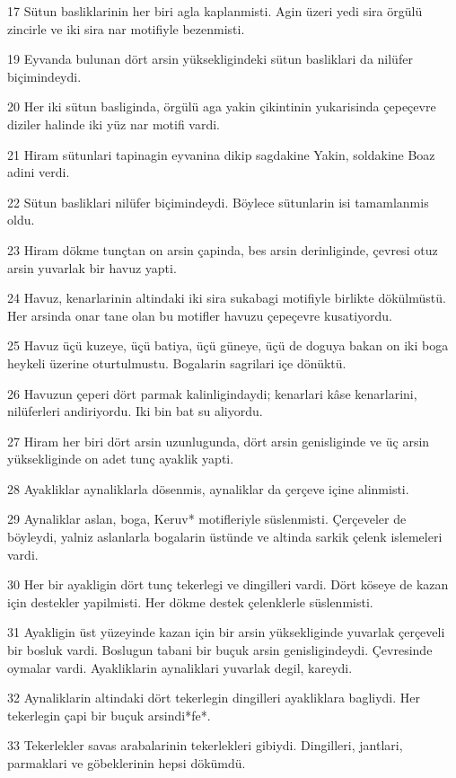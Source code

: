 \par 17 Sütun basliklarinin her biri agla kaplanmisti. Agin üzeri yedi sira örgülü zincirle ve iki sira nar motifiyle bezenmisti.
\par 19 Eyvanda bulunan dört arsin yüksekligindeki sütun basliklari da nilüfer biçimindeydi.
\par 20 Her iki sütun basliginda, örgülü aga yakin çikintinin yukarisinda çepeçevre diziler halinde iki yüz nar motifi vardi.
\par 21 Hiram sütunlari tapinagin eyvanina dikip sagdakine Yakin, soldakine Boaz adini verdi.
\par 22 Sütun basliklari nilüfer biçimindeydi. Böylece sütunlarin isi tamamlanmis oldu.
\par 23 Hiram dökme tunçtan on arsin çapinda, bes arsin derinliginde, çevresi otuz arsin yuvarlak bir havuz yapti.
\par 24 Havuz, kenarlarinin altindaki iki sira sukabagi motifiyle birlikte dökülmüstü. Her arsinda onar tane olan bu motifler havuzu çepeçevre kusatiyordu.
\par 25 Havuz üçü kuzeye, üçü batiya, üçü güneye, üçü de doguya bakan on iki boga heykeli üzerine oturtulmustu. Bogalarin sagrilari içe dönüktü.
\par 26 Havuzun çeperi dört parmak kalinligindaydi; kenarlari kâse kenarlarini, nilüferleri andiriyordu. Iki bin bat su aliyordu.
\par 27 Hiram her biri dört arsin uzunlugunda, dört arsin genisliginde ve üç arsin yüksekliginde on adet tunç ayaklik yapti.
\par 28 Ayakliklar aynaliklarla dösenmis, aynaliklar da çerçeve içine alinmisti.
\par 29 Aynaliklar aslan, boga, Keruv* motifleriyle süslenmisti. Çerçeveler de böyleydi, yalniz aslanlarla bogalarin üstünde ve altinda sarkik çelenk islemeleri vardi.
\par 30 Her bir ayakligin dört tunç tekerlegi ve dingilleri vardi. Dört köseye de kazan için destekler yapilmisti. Her dökme destek çelenklerle süslenmisti.
\par 31 Ayakligin üst yüzeyinde kazan için bir arsin yüksekliginde yuvarlak çerçeveli bir bosluk vardi. Boslugun tabani bir buçuk arsin genisligindeydi. Çevresinde oymalar vardi. Ayakliklarin aynaliklari yuvarlak degil, kareydi.
\par 32 Aynaliklarin altindaki dört tekerlegin dingilleri ayakliklara bagliydi. Her tekerlegin çapi bir buçuk arsindi*fe*.
\par 33 Tekerlekler savas arabalarinin tekerlekleri gibiydi. Dingilleri, jantlari, parmaklari ve göbeklerinin hepsi dökümdü.
